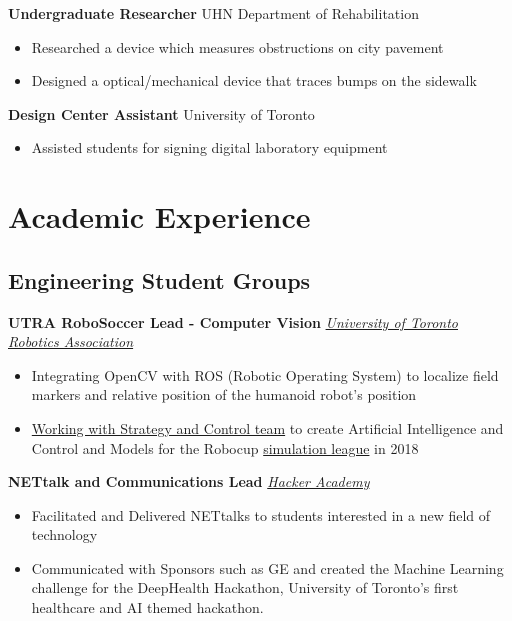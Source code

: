 \documentclass[10pt, a4paper]{cv}
\begin{document}
	\textbf{Undergraduate Researcher} \hfill UHN Department of Rehabilitation
	\begin{itemize}
		\item Researched a device which measures obstructions on city pavement
		\item Designed a optical/mechanical device that traces bumps on the sidewalk
	\end{itemize}
	
	\textbf{Design Center Assistant} \hfill University of Toronto
	\begin{itemize}
		\item Assisted students for signing digital laboratory equipment
	\end{itemize}

\section*{Academic Experience}

\subsection*{Engineering Student Groups}\noindent

	\textbf{UTRA RoboSoccer Lead - Computer Vision} \hfill \emph{\href{http://www.utra.ca}{University of Toronto Robotics Association}}
	\begin{itemize}
		\item Integrating OpenCV with ROS (Robotic Operating System) to localize field markers and relative position of the humanoid robot's position
		\item \href{https://github.com/utra-robosoccer/soccerbot}{Working with Strategy and Control team} to create Artificial Intelligence and Control and Models for the Robocup \href{http://wiki.robocup.org/Soccer_Simulation_League}{simulation league} in 2018
	\end{itemize}
	
	\textbf{NETtalk and Communications Lead} \hfill \emph{\href{http://hackeracademy.org}{Hacker Academy}}
	\begin{itemize}
		\item Facilitated and Delivered NETtalks to students interested in a new field of technology
		\item Communicated with Sponsors such as GE and created the Machine Learning challenge for the DeepHealth Hackathon, University of Toronto's first healthcare and AI themed hackathon.
	\end{itemize}
	
\end{document}
